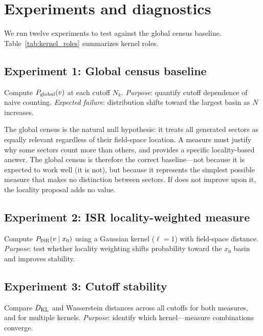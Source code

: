 \section{Experiments and diagnostics}
\label{sec:experiments}

We run twelve experiments to test \ISR against the global census baseline.
Table~\ref{tab:kernel_roles} summarizes kernel roles.



\subsection{Experiment 1: Global census baseline}
\label{exp:1}

Compute $P_{\rm global}(v)$ at each cutoff $N_k$.
\emph{Purpose}: quantify cutoff dependence of naive counting.
\emph{Expected failure}: distribution shifts toward the largest basin as $N$ increases.

The global census is the natural null hypothesis: it treats all generated sectors
as equally relevant regardless of their field-space location.
A measure must justify why some sectors count more than others, and \ISR provides
a specific locality-based answer.
The global census is therefore the correct baseline---not because it is expected
to work well (it is not), but because it represents the simplest possible measure
that makes no distinction between sectors.
If \ISR does not improve upon it, the locality proposal adds no value.

\subsection{Experiment 2: ISR locality-weighted measure}
\label{exp:2}

Compute $P_{\rm ISR}(v \mid x_0)$ using a Gaussian kernel ($\ell = 1$)
with field-space distance.
\emph{Purpose}: test whether locality weighting shifts probability toward the
$x_0$ basin and improves stability.

\subsection{Experiment 3: Cutoff stability}
\label{exp:3}

Compare $D_{\rm KL}$ and Wasserstein distances across all cutoffs
for both measures, and for multiple kernels.
\emph{Purpose}: identify which kernel---measure combinations converge.

